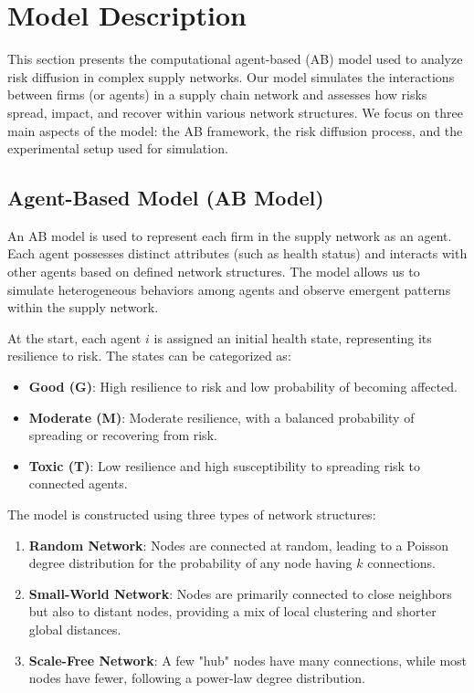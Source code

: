 \documentclass{article}
\begin{document}
\section{Model Description}

This section presents the computational agent-based (AB) model used to analyze risk diffusion in complex supply networks. Our model simulates the interactions between firms (or agents) in a supply chain network and assesses how risks spread, impact, and recover within various network structures. We focus on three main aspects of the model: the AB framework, the risk diffusion process, and the experimental setup used for simulation.

\subsection{Agent-Based Model (AB Model)}
An AB model is used to represent each firm in the supply network as an agent. Each agent possesses distinct attributes (such as health status) and interacts with other agents based on defined network structures. The model allows us to simulate heterogeneous behaviors among agents and observe emergent patterns within the supply network.

At the start, each agent \( i \) is assigned an initial health state, representing its resilience to risk. The states can be categorized as:
\begin{itemize}
    \item \textbf{Good (G)}: High resilience to risk and low probability of becoming affected.
    \item \textbf{Moderate (M)}: Moderate resilience, with a balanced probability of spreading or recovering from risk.
    \item \textbf{Toxic (T)}: Low resilience and high susceptibility to spreading risk to connected agents.
\end{itemize}

The model is constructed using three types of network structures:
\begin{enumerate}
    \item \textbf{Random Network}: Nodes are connected at random, leading to a Poisson degree distribution for the probability of any node having \( k \) connections.
    \item \textbf{Small-World Network}: Nodes are primarily connected to close neighbors but also to distant nodes, providing a mix of local clustering and shorter global distances.
    \item \textbf{Scale-Free Network}: A few "hub" nodes have many connections, while most nodes have fewer, following a power-law degree distribution.
\end{enumerate}
\end{document}
